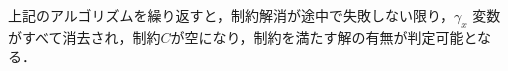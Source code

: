 \begin{oframed}
\end{oframed}

上記のアルゴリズムを繰り返すと，制約解消が途中で失敗しない限り，$\gamma_x$ 変数がすべて消去され，制約$C$が空になり，制約を満たす解の有無が判定可能となる．








